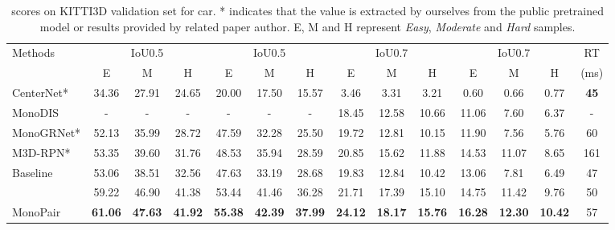 \documentclass[10pt,twocolumn,letterpaper]{article}
\begin{document}
\begin{table*}[!ht]
		\centering
		\renewcommand\arraystretch{1.0}
		\renewcommand{\tabcolsep}{3pt}
		\begin{tabular}{l|ccc|ccc|ccc|ccc|c }
			\hline
			\multirow{2}{*}{Methods}& \multicolumn{3}{c|}{ IoU0.5} & \multicolumn{3}{c|}{ IoU0.5} & \multicolumn{3}{c|}{ IoU0.7} & \multicolumn{3}{c|}{ IoU0.7} & RT \\
			\cline{2-13}
			& E & M & H  & E & M & H  & E & M & H  & E & M & H & (ms)\\
			\hline
			CenterNet\cite{zhou_objects_2019}*	&34.36	&27.91	&24.65	&20.00	&17.50	&15.57	&3.46	&3.31	&3.21	&0.60	&0.66	&0.77	& \textbf{45} \\
			MonoDIS\cite{simonelli_disentangling_2019} & - & - & - & - & - & - & 18.45 & 12.58 & 10.66 & 11.06 & 7.60 & 6.37 & -\\
			MonoGRNet\cite{qin_monogrnet_2018}* & 52.13 & 35.99 & 28.72 & 47.59 & 32.28 & 25.50 & 19.72 & 12.81 & 10.15 & 11.90 & 7.56 & 5.76 & 60\\ M3D-RPN\cite{brazil_m3d_rpn_2019}*  & 53.35 & 39.60 & 31.76 & 48.53 & 35.94 & 28.59 & 20.85 & 15.62 & 11.88 & 14.53 & 11.07 & 8.65 & 161\\ \hline
			Baseline & 53.06 & 38.51 & 32.56 & 47.63 & 33.19 & 28.68 & 19.83 & 12.84 & 10.42 & 13.06 &  7.81 &  6.49 & 47 \\
			 & 59.22 & 46.90 & 41.38 & 53.44 & 41.46 & 36.28 & 21.71 & 17.39 & 15.10 & 14.75 & 11.42 &  9.76& 50 \\
			MonoPair & \textbf{61.06} & \textbf{47.63} & \textbf{41.92} & \textbf{55.38} & \textbf{42.39} & \textbf{37.99} & \textbf{24.12} & \textbf{18.17} & \textbf{15.76} & \textbf{16.28} & \textbf{12.30} & \textbf{10.42} & 57  \\
			\hline
		\end{tabular}
	\caption{ scores on KITTI3D validation set for car. * indicates that the value is extracted by ourselves from the public pretrained model or results provided by related paper author. E, M and H represent \textit{Easy}, \textit{Moderate} and \textit{Hard} samples.}
	\label{tab:ap40}
\end{table*}
\end{document}
